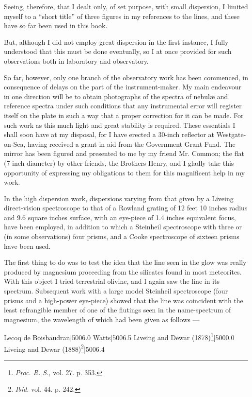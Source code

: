 \documentclass[a4paper, 12pt, oneside, polutonikogreek, english]{article}
\begin{document}
Seeing, therefore, that I dealt only, of set purpose, with small dispersion, I limited myself to a ``short title'' of three figures in my references to the lines, and these have so far been used in this book.

But, although I did not employ great dispersion in the first instance, I fully understood that this must be done eventually, so I at once provided for such observations both in laboratory and observatory.

So far, however, only one branch of the observatory work has been commenced, in consequence of delays on the part of the instrument-maker. My main endeavour in one direction will be to obtain photographs of the spectra of nebulæ and reference spectra under such conditions that any instrumental error will register itself on the plate in such a way that a proper correction for it can be made. For such work as this much light and great stability is required. These essentials I shall soon have at my disposal, for I have erected a 30-inch reflector at Westgate-on-Sea, having received a grant in aid from the Government Grant Fund. The mirror has been figured and presented to me by my friend Mr. Common; the flat (7-inch diameter) by other friends, the Brothers Henry, and I gladly take this opportunity of expressing my obligations to them for this magnificent help in my work.

In the high dispersion work, dispersions varying from that given by a Liveing direct-vision spectroscope to that of a Rowland grating of 12 feet 10 inches radius and 9.6 square inches surface, with an eye-piece of 1.4 inches equivalent focus, have been employed, in addition to which a Steinheil spectroscope with three or (in some observations) four prisms, and a Cooke spectroscope of sixteen prisms have been used.

The first thing to do was to test the idea that the line seen in the glow was really produced by magnesium proceeding from the silicates found in most meteorites. With this object I tried terrestrial olivine, and I again saw the line in its spectrum. Subsequent work with a large model Steinheil spectroscope (four prisms and a high-power eye-piece) showed that the line was coincident with the least refrangible member of one of the flutings seen in the name-spectrum of magnesium, the wavelength of which had been given as follows ---

Lecoq de Boisbaudran|5006.0 
Watts|5006.5 
Liveing and Dewar (1878)\footnote{\emph{Proc. R. S.}, vol. 27. p. 353.}|5000.0 
Liveing and Dewar (1888)\footnote{\emph{Ibid.} vol. 44. p. 242.}|5006.4
\end{document}
